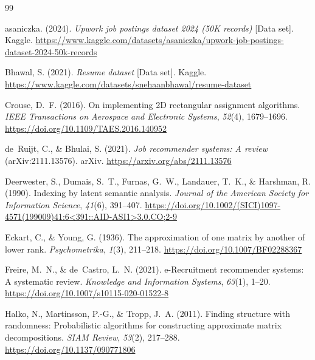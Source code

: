 \begin{thebibliography}{99}

asaniczka. (2024). \textit{Upwork job postings dataset 2024 (50K records)} [Data set]. Kaggle. \url{https://www.kaggle.com/datasets/asaniczka/upwork-job-postings-dataset-2024-50k-records}

Bhawal, S. (2021). \textit{Resume dataset} [Data set]. Kaggle. \url{https://www.kaggle.com/datasets/snehaanbhawal/resume-dataset}

Crouse, D.~F. (2016). On implementing 2D rectangular assignment algorithms. \textit{IEEE Transactions on Aerospace and Electronic Systems}, \textit{52}(4), 1679--1696. \url{https://doi.org/10.1109/TAES.2016.140952}

de~Ruijt, C., \& Bhulai, S. (2021). \textit{Job recommender systems: A review} (arXiv:2111.13576). arXiv. \url{https://arxiv.org/abs/2111.13576}

Deerwester, S., Dumais, S.~T., Furnas, G.~W., Landauer, T.~K., \& Harshman, R. (1990). Indexing by latent semantic analysis. \textit{Journal of the American Society for Information Science}, \textit{41}(6), 391--407. \url{https://doi.org/10.1002/(SICI)1097-4571(199009)41:6<391::AID-ASI1>3.0.CO;2-9}

Eckart, C., \& Young, G. (1936). The approximation of one matrix by another of lower rank. \textit{Psychometrika}, \textit{1}(3), 211--218. \url{https://doi.org/10.1007/BF02288367}

Freire, M.~N., \& de~Castro, L.~N. (2021). e-Recruitment recommender systems: A systematic review. \textit{Knowledge and Information Systems}, \textit{63}(1), 1--20. \url{https://doi.org/10.1007/s10115-020-01522-8}

Halko, N., Martinsson, P.-G., \& Tropp, J.~A. (2011). Finding structure with randomness: Probabilistic algorithms for constructing approximate matrix decompositions. \textit{SIAM Review}, \textit{53}(2), 217--288. \url{https://doi.org/10.1137/090771806}


\end{thebibliography}
